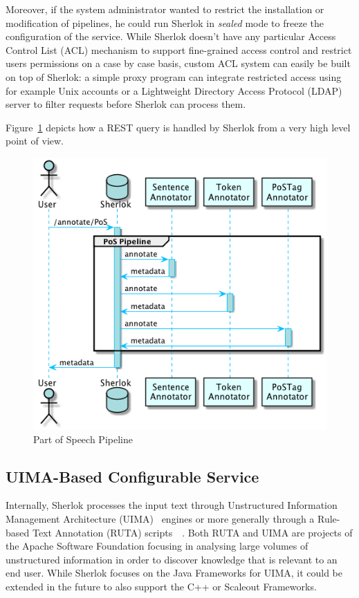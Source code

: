 \documentclass{article}
\begin{document}
Moreover, if the system administrator wanted to restrict the installation or modification of
pipelines, he could run Sherlok in \emph{sealed} mode to freeze the configuration of the service.
While Sherlok doesn't have any particular Access Control List (ACL) mechanism to support
fine-grained access control and restrict users permissions on a case by case basis, custom ACL
system can easily be built on top of Sherlok: a simple proxy program can integrate restricted access
using for example Unix accounts or a Lightweight Directory Access Protocol (LDAP) server to filter
requests before Sherlok can process them.

Figure~\ref{fig:sherlok_basic_rest_call} depicts how a REST query is handled by Sherlok from a very
high level point of view.

\begin{figure}
    \centering
    \includegraphics[width=0.7\linewidth]{res/sherlok_basic_rest_call.png}
    \caption{Part of Speech Pipeline}
    \label{fig:sherlok_basic_rest_call}
\end{figure}

\subsection{UIMA-Based Configurable Service}

Internally, Sherlok processes the input text through Unstructured Information Management
Architecture (UIMA)~\cite{uima} engines or more generally through a Rule-based Text Annotation
(RUTA) scripts~\cite{ruta}~\cite{ruta_2014}. Both RUTA and UIMA are projects of the Apache Software
Foundation \cite{apachefundation} focusing in analysing large volumes of unstructured information in
order to discover knowledge that is relevant to an end user. While Sherlok focuses on the Java
Frameworks for UIMA, it could be extended in the future to also support the C++ or Scaleout
Frameworks.
\end{document}

